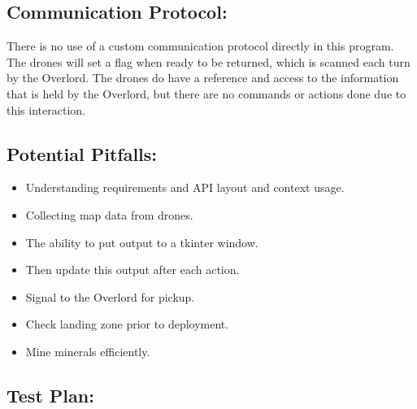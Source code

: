 \documentclass{article}
\begin{document}
\subsection{Communication Protocol:}

    There is no use of a custom communication protocol directly in this program. The drones will set a flag when ready to be returned, which is scanned each turn by the Overlord. The drones do have a reference and access to the information that is held by the Overlord, but there are no commands or actions done due to this interaction. 

\subsection{Potential Pitfalls:}
\begin{itemize}
    \item Understanding requirements and API layout and context usage. 
    \item Collecting map data from drones.
    \item The ability to put output to a tkinter window.
    \item Then update this output after each action.
    \item Signal to the Overlord for pickup.
    \item Check landing zone prior to deployment.
    \item Mine minerals efficiently.
\end{itemize}

\subsection{Test Plan:}
\end{document}
